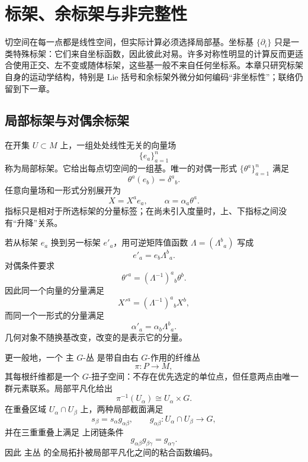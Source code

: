 \chapter{标架、余标架与非完整性}

切空间在每一点都是线性空间，但实际计算必须选择局部基。坐标基 $\{\partial_i\}$ 只是一类特殊标架：它们来自坐标函数，因此彼此对易。许多对称性明显的计算反而更适合使用正交、左不变或随体标架，这些基一般不来自任何坐标系。本章只研究标架自身的运动学结构，特别是 Lie 括号和余标架外微分如何编码“非坐标性”；联络仍留到下一章。

\section{局部标架与对偶余标架}
在开集 $U\subset M$ 上，一组处处线性无关的向量场
\[
\{e_a\}_{a=1}^n
\]
称为局部标架。它给出每点切空间的一组基。唯一的对偶一形式 $\{\theta^a\}_{a=1}^n$ 满足
\begin{equation}\label{eq:math-dg-frame-duality}
\theta^a(e_b)=\delta^a{}_b.
\end{equation}
任意向量场和一形式分别展开为
\[
X=X^ae_a,
\qquad
\alpha=\alpha_a\theta^a.
\]
指标只是相对于所选标架的分量标签；在尚未引入度量时，上、下指标之间没有“升降”关系。

若从标架 $e_a$ 换到另一标架 $e'_a$，用可逆矩阵值函数 $\Lambda=(\Lambda^b{}_a)$ 写成
\begin{equation}\label{eq:math-dg-frame-change}
e'_a=e_b\Lambda^b{}_a.
\end{equation}
对偶条件要求
\[
\theta'^a=(\Lambda^{-1})^a{}_b\theta^b.
\]
因此同一个向量的分量满足
\[
X'^a=(\Lambda^{-1})^a{}_bX^b,
\]
而同一个一形式的分量满足
\[
\alpha'_a=\alpha_b\Lambda^b{}_a.
\]
几何对象不随换基改变，改变的是表示它的分量。

更一般地，一个 主 $G$-丛 是带自由右 $G$-作用的纤维丛
\[
\pi:P\to M,
\]
其每根纤维都是一个 $G$-扭子空间：不存在优先选定的单位点，但任意两点由唯一群元素联系。局部平凡化给出
\[
\pi^{-1}(U_\alpha)\cong U_\alpha\times G.
\]
在重叠区域 $U_\alpha\cap U_\beta$ 上，两种局部截面满足
\begin{equation*}s_\beta=s_\alpha g_{\alpha\beta},
\qquad
g_{\alpha\beta}:U_\alpha\cap U_\beta\to G,\end{equation*}
并在三重重叠上满足 上闭链条件
\begin{equation}
g_{\alpha\beta}g_{\beta\gamma}=g_{\alpha\gamma}.
\label{eq:principal-transition-cocycle}
\end{equation}
因此 主丛 的全局拓扑被局部平凡化之间的粘合函数编码。

